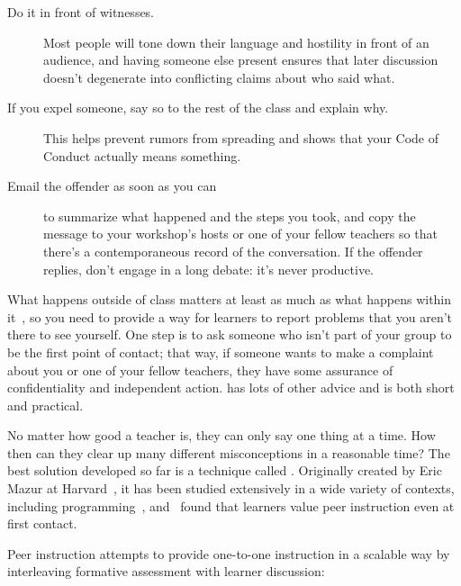 \begin{description}

\item[Do it in front of witnesses.]
  Most people will tone down their language and hostility in front of an audience,
  and having someone else present ensures that
  later discussion doesn't degenerate into conflicting claims about who said what.

\item[If you expel someone, say so to the rest of the class and explain why.]
  This helps prevent rumors from spreading
  and shows that your Code of Conduct actually means something.

\item[Email the offender as soon as you can]
  to summarize what happened and the steps you took,
  and copy the message to your workshop's hosts or one of your fellow teachers
  so that there's a contemporaneous record of the conversation.
  If the offender replies,
  don't engage in a long debate:
  it's never productive.

\end{description}

What happens outside of class matters at least as much as what happens within it~\cite{Part2011},
so you need to provide a way for learners to report problems that you aren't there to see yourself.
One step is to ask someone who isn't part of your group to be the first point of contact;
that way,
if someone wants to make a complaint about you or one of your fellow teachers,
they have some assurance of confidentiality and independent action.
\cite{Auro2019} has lots of other advice
and is both short and practical.


No matter how good a teacher is,
they can only say one thing at a time.
How then can they clear up many different misconceptions in a reasonable time?
The best solution developed so far is a technique called .
Originally created by Eric Mazur at Harvard~\cite{Mazu1996},
it has been studied extensively in a wide variety of contexts,
including programming~\cite{Crou2001,Port2013},
and~\cite{Port2016} found that learners value peer instruction even at first contact.

Peer instruction attempts to provide one-to-one instruction in a scalable way
by interleaving formative assessment with learner discussion:

